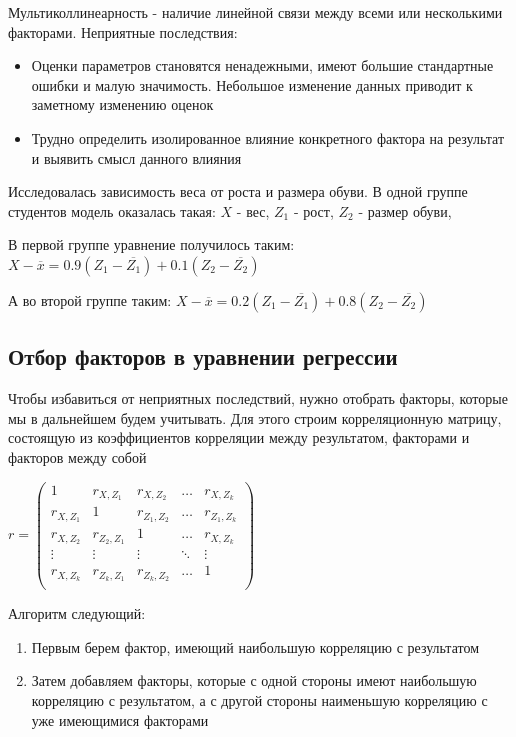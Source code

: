 \documentclass[12pt]{article}
\begin{document}
\Def Мультиколлинеарность - наличие линейной связи между всеми или несколькими факторами. Неприятные последствия:

\begin{itemize}
    \item Оценки параметров становятся ненадежными, имеют большие стандартные ошибки и малую значимость.
    Небольшое изменение данных приводит к заметному изменению оценок
    \item Трудно определить изолированное влияние конкретного фактора на результат и выявить смысл данного влияния
\end{itemize}

\Ex Исследовалась зависимость веса от роста и размера обуви. В одной группе студентов модель оказалась такая: 
$X$ - вес, $Z_1$ - рост, $Z_2$ - размер обуви, 

В первой группе уравнение получилось таким: $X - \overline{x} = 0.9(Z_1 - \overline{Z_1}) + 0.1(Z_2 - \overline{Z_2})$

А во второй группе таким: $X - \overline{x} = 0.2(Z_1 - \overline{Z_1}) + 0.8(Z_2 - \overline{Z_2})$

\subsection{Отбор факторов в уравнении регрессии}

Чтобы избавиться от неприятных последствий, нужно отобрать факторы, которые мы в дальнейшем будем учитывать. Для этого строим корреляционную матрицу, состоящую из коэффициентов корреляции между результатом, факторами и факторов между собой 

\smallvspace

$r = \begin{pmatrix}
    1 & r_{X, Z_1} & r_{X, Z_2} & \dots & r_{X, Z_k} \\ 
    r_{X, Z_1} & 1 & r_{Z_1, Z_2} & \dots & r_{Z_1, Z_k} \\ 
    r_{X, Z_2} & r_{Z_2, Z_1} & 1 & \dots & r_{X, Z_k} \\ 
    \vdots & \vdots & \vdots & \ddots & \vdots \\ 
    r_{X, Z_k} & r_{Z_k, Z_1} & r_{Z_k, Z_2} & \dots & 1 \\ 
\end{pmatrix}$

\smallvspace

Алгоритм следующий: 

\begin{enumerate}
    \item Первым берем фактор, имеющий наибольшую корреляцию с результатом
    \item Затем добавляем факторы, которые с одной стороны имеют наибольшую корреляцию с результатом, а с другой стороны наименьшую корреляцию с уже имеющимися факторами
\end{enumerate}
\end{document}
